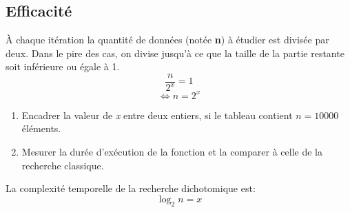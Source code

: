 \documentclass[a4paper,11pt]{article}
\begin{document}
\subsection{Efficacité}
À chaque itération la quantité de données (notée \textbf{n}) à étudier est divisée par deux. Dans le pire des cas, on divise jusqu'à ce que la taille de la partie restante soit inférieure ou égale à 1.
$$\dfrac{n}{2^x}=1$$
$$\Leftrightarrow n=2^x$$
\begin{activite}
\begin{enumerate}
    \item Encadrer la valeur de \emph{x} entre deux entiers, si le tableau contient $n=10000$ éléments.
    \item Mesurer la durée d'exécution de la fonction et la comparer à celle de la recherche classique.
\end{enumerate}
\end{activite}
\begin{aretenir}[]
La complexité temporelle de la recherche dichotomique est:
{\Large$$ \log_2{n} =x$$}
\end{aretenir}
\end{document}
